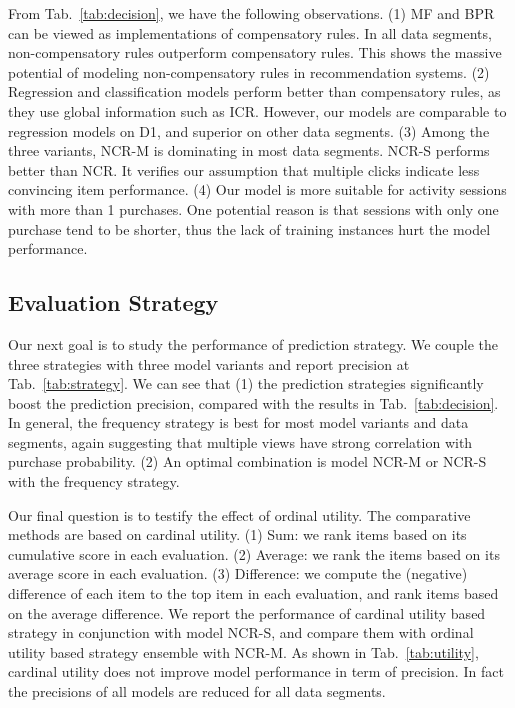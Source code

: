 \documentclass[sigconf]{acmart}
\begin{document}
From Tab.~\ref{tab:decision}, we have the following observations. (1) MF and BPR can be viewed as implementations of compensatory rules. In all data segments, non-compensatory rules outperform compensatory rules. This shows the massive potential of modeling non-compensatory rules in recommendation systems. (2) Regression and classification models perform better than compensatory rules, as they use global information such as ICR. However, our models are comparable to regression models on D1, and superior on other data segments. (3) Among the three variants, NCR-M is dominating in most data segments. NCR-S performs better than NCR. It verifies our assumption that multiple clicks indicate less convincing item performance. (4) Our model is more suitable for activity sessions with more than 1 purchases. One potential reason is that sessions with only one purchase tend to be shorter, thus the lack of training instances hurt the model performance.  



\subsection{Evaluation Strategy}


Our next goal is to study the performance of prediction strategy. We couple the three strategies with three model variants and report precision at Tab.~\ref{tab:strategy}. We can see that (1) the prediction strategies significantly boost the prediction precision, compared with the results in Tab.~\ref{tab:decision}. In general, the frequency strategy is best for most model variants and data segments, again suggesting that multiple views have strong correlation with purchase probability.  (2) An optimal combination is model NCR-M or NCR-S with the frequency strategy. 




Our final question is to testify the effect of ordinal utility. The comparative methods are based on  cardinal utility. (1) Sum: we rank items based on its cumulative score in each evaluation. (2) Average: we rank the items based on its average score in each evaluation. (3) Difference: we compute the (negative) difference of each item to the top item in each evaluation, and rank items based on the average difference. We report the performance of cardinal utility based strategy in conjunction with model NCR-S, and compare them with ordinal utility based strategy ensemble with NCR-M. As shown in Tab.~\ref{tab:utility}, cardinal utility does not improve model performance in term of precision. In fact the precisions of all models are reduced for all data segments. 
\end{document}
